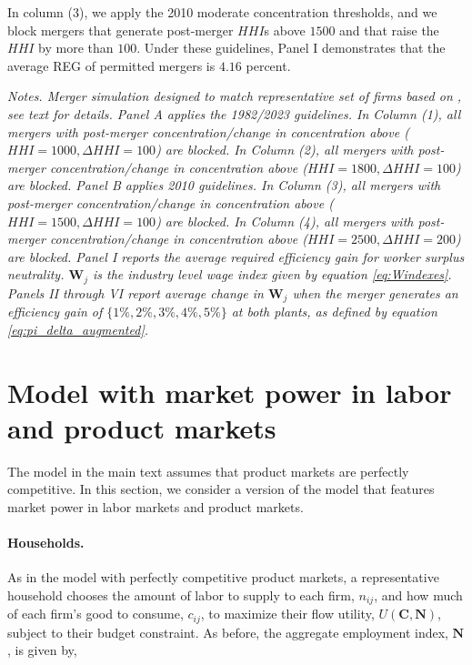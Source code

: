 \documentclass[12pt]{article}
\theoremstyle{prop}
\begin{document}
In column (3), we apply the 2010 moderate concentration thresholds, and we block mergers that generate post-merger $HHI$s above $1500$ and that raise the $HHI$ by more than $100$. Under these guidelines, Panel I demonstrates that the average REG of permitted mergers is $4.16$ percent.   

\begin{table}[p!]
    \centering
    \resizebox{\textwidth}{!}{}
    \caption{Comparison of 1982/2023 and 2010 guidelines. \label{tab:moderate_merger_guidelines}}
    \begin{footnotesize}
    \begin{flushleft}
     \textit{Notes. Merger simulation designed to match representative set of firms based on \citet{Arnold}, see text for details. Panel A  applies the 1982/2023 guidelines. In Column (1), all mergers with post-merger concentration/change in concentration above ($HHI=1000, \Delta HHI=100$) are blocked.  In Column (2), all mergers with post-merger concentration/change in concentration above ($HHI=1800, \Delta HHI=100$) are blocked. Panel B  applies 2010 guidelines. In Column (3), all mergers with post-merger concentration/change in concentration above ($HHI=1500, \Delta HHI=100$) are blocked.  In Column (4), all mergers with post-merger concentration/change in concentration above ($HHI=2500, \Delta HHI=200$) are blocked. Panel I  reports the average required efficiency gain for worker surplus neutrality. $\mathbf{W}_j$ is the industry level wage index given by equation \eqref{eq:Windexes}. Panels II through VI report average change in $\mathbf{W}_j$  when the merger generates an efficiency gain of $\{1\%,2\%,3\%,4\%,5\%\}$  at both plants, as defined by equation \eqref{eq:pi_delta_augmented}.  }   
     \end{flushleft}
    \end{footnotesize}
\end{table}

\section{Model with market power in labor and product markets}
\label{app:product_market}

The model in the main text assumes that product markets are perfectly competitive. In this section, we consider a version of the model that features market power in labor markets and product markets. 

\paragraph{Households.} As in the model with perfectly competitive product markets, a representative household chooses the amount of labor to supply to each firm, $n_{ij}$, and how much of each firm's good to consume, $c_{ij}$, to maximize their flow utility, $U(\mathbf{C}, \mathbf{N})$, subject to their budget constraint. As before, the aggregate employment index, $\mathbf{N}$, is given by,
\end{document}
